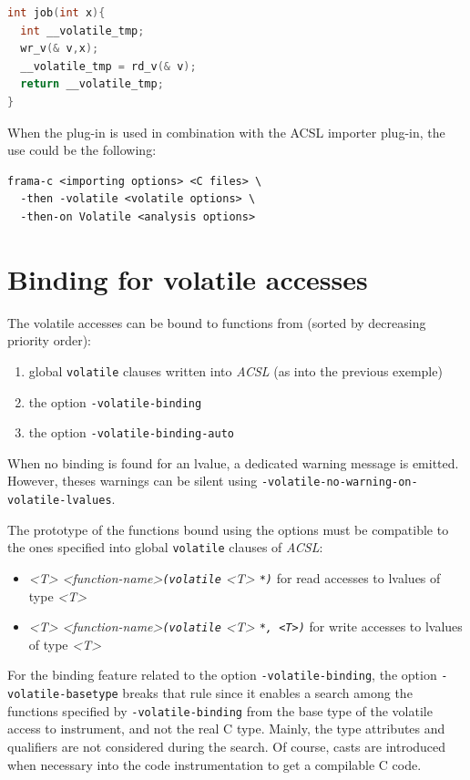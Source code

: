 \documentclass{frama-c-book}
\begin{document}
\begin{lstlisting}[language=c, style=frama-c-style]
int job(int x){
  int __volatile_tmp;
  wr_v(& v,x);
  __volatile_tmp = rd_v(& v);
  return __volatile_tmp;
}

\end{lstlisting}


When the plug-in is used in combination with the ACSL importer plug-in, the use could be the following:

\begin{lstlisting}[language=frama-c-commands, style=frama-c-style]
frama-c <importing options> <C files> \
  -then -volatile <volatile options> \
  -then-on Volatile <analysis options>
\end{lstlisting}

\chapter{Binding for volatile accesses}

The volatile accesses can be bound to functions from (sorted by decreasing priority order):
\begin{enumerate}
\item global \verb|volatile| clauses written into {\sl ACSL} (as into the previous exemple)
\item the option \verb|-volatile-binding|
\item the option \verb|-volatile-binding-auto|
\end{enumerate}
When no binding is found for an lvalue, a dedicated warning message is emitted.
However, theses warnings can be silent using \verb|-volatile-no-warning-on-volatile-lvalues|.

The prototype of the functions bound using the options must be compatible to the ones specified into global \verb|volatile| clauses of {\sl ACSL}:
\begin{itemize}
\item  {\sl <T> <function-name>\verb|(volatile| <T> \verb|*)|} for read accesses to lvalues of type {\sl <T>}
\item  {\sl <T> <function-name>\verb|(volatile| <T> \verb|*, <T>)|} for write accesses to lvalues of type {\sl <T>}
\end{itemize}

For the binding feature related to the option \verb|-volatile-binding|, the option \verb|-volatile-basetype| breaks that rule since it enables a search among the functions specified by \verb|-volatile-binding| from the base type of the volatile access to instrument, and not the real C type.
Mainly, the type attributes and qualifiers are not considered during the search.
Of course, casts are introduced when necessary into the code instrumentation to get a compilable C code.
\end{document}
